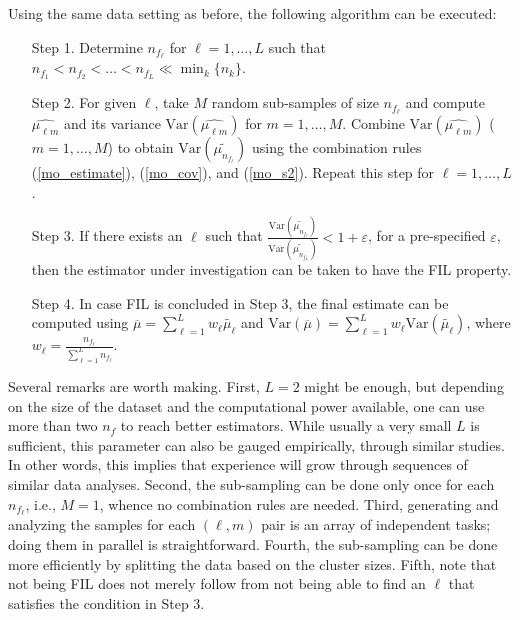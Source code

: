 \documentclass[11pt,a5paper,twoside]{book}
\begin{document}
Using the same data setting as before, the following algorithm can be executed:
\begin{enumerate}
\item[Step 1.] Determine $n_{f_\ell}$ for $\ell=1,\ldots,L$ such that $n_{f_1} < n_{f_2}<\ldots< n_{f_L} \ll \min_k\{n_k\}$.
\item[Step 2.] For given $\ell$, take $M$ random sub-samples of size $n_{f_\ell}$ and compute $\widehat{\mu_{\ell m}}$ and its variance $\mathrm{Var}(\widehat{\mu_{\ell m}})$ for $m=1,\ldots,M$. Combine $\mathrm{Var}(\widehat{\mu_{\ell m}})$ ($m=1,\ldots,M$) to obtain $\mathrm{Var}(\widetilde{\mu_{n_{f_\ell}}})$ using the combination rules (\ref{mo_estimate}), (\ref{mo_cov}), and (\ref{mo_s2}). Repeat this step for $\ell=1,\ldots,L$.
\item[Step 3.] If there exists an $\ell$ such that $\frac{\mathrm{Var}(\widetilde{\mu_{n_{f_{\ell}}}})}{\mathrm{Var}(\widetilde{\mu_{n_{f_L}}})} < 1+\varepsilon$, for a pre-specified $\varepsilon$, then the estimator under investigation can be taken to have the FIL property.
\item[Step 4.] In case FIL is concluded in Step 3, the final estimate can be computed using $\overline{\mu}=\sum_{\ell=1}^L w_\ell \widetilde{\mu_\ell}$ and $\mathrm{Var}(\overline{\mu}) = \sum_{\ell=1}^L w_\ell \mathrm{Var}(\widetilde{\mu_\ell})$, where $w_\ell = \frac{n_{f_\ell}}{\sum_{\ell=1}^L n_{f_\ell}}$.
\end{enumerate}
Several remarks are worth making. First, $L=2$ might be enough, but depending on the size of the dataset and the computational power available, one can use more than two $n_f$ to reach better estimators. While usually a very small $L$ is sufficient, this parameter can also be gauged empirically, through similar studies. In other words, this implies that experience will grow through sequences of similar data analyses. Second, the sub-sampling can be done only once for each $n_{f_\ell}$, i.e., $M=1$, whence no combination rules are needed. Third, generating and analyzing the samples for each $(\ell,m)$ pair is an array of independent tasks; doing them in parallel is straightforward. Fourth, the sub-sampling can be done more efficiently by splitting the data based on the cluster sizes. Fifth, note that not being FIL does not merely follow from not being able to find an $\ell$ that satisfies the condition in Step 3.
\end{document}
